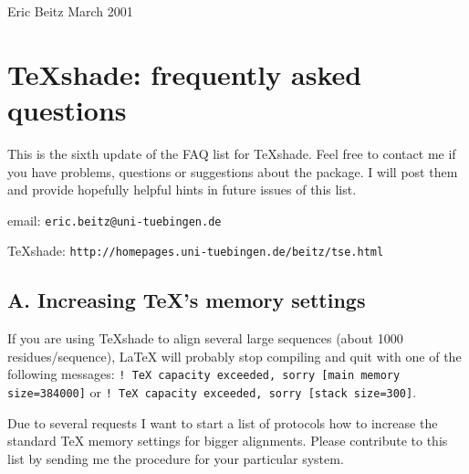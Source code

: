 \documentclass[12pt]{article}
\begin{document}
    
\noindent
Eric Beitz \hfill March 2001

\section*{\TeX{}shade: frequently asked questions }
\bigskip

This is the sixth update of the FAQ list for \TeX{}shade. Feel free to 
contact me if you have problems, questions or suggestions about the 
package. I will post them and provide hopefully helpful hints in 
future issues of this list.
\bigskip

\noindent
\qquad email: \texttt{eric.beitz@uni-tuebingen.de}
\smallskip

\noindent
\TeX{}shade: 
\texttt{http://homepages.uni-tuebingen.de/beitz/tse.html}


\subsection*{A. Increasing \TeX{}'s memory settings}
\medskip

    If you are using \TeX{}shade to align several large sequences (about 1000
    residues/sequence), LaTeX will probably stop compiling and quit with one
    of the following messages: 
    \texttt{!\ TeX capacity exceeded, sorry [main memory size=384000]} or 
    \texttt{!\ TeX capacity exceeded, sorry [stack size=300]}.

Due to several requests I want to start a list of protocols how
to increase the standard \TeX{} memory settings for bigger 
alignments. Please contribute to this list by sending me the
procedure for your particular system.
\end{document}
